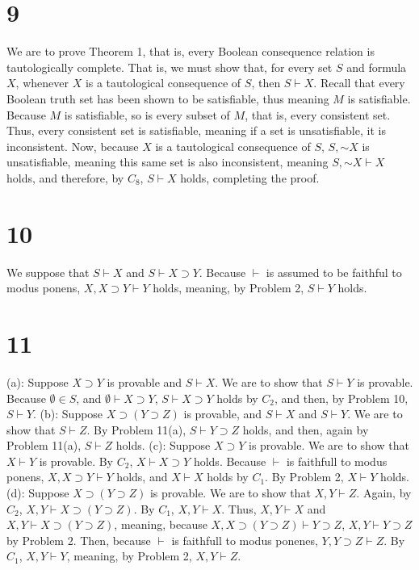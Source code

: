 \documentclass{article}
\newcommand*{\oldneg}{\mathord{\sim}}
\let\oldemptyset\emptyset
\theoremstyle{definition}
\begin{document}
\section*{9}
We are to prove Theorem 1, that is, every Boolean consequence relation is tautologically complete. That is, we must show that, for every set $S$ 
and formula $X$, whenever $X$ is a tautological consequence of $S$, then $S\vdash X$. 
Recall that every Boolean truth set has been shown to be satisfiable, thus meaning $M$ is satisfiable. Because $M$ is satisfiable, so is every 
subset of $M$, that is, every consistent set. Thus, every consistent set is satisfiable, meaning if a set is unsatisfiable, it is inconsistent. Now, 
because $X$ is a tautological consequence of $S$, $S,\oldneg X$ is unsatisfiable, meaning this same set is also inconsistent, meaning 
$S,\oldneg X\vdash X$ holds, and therefore, by $C_8$, $S\vdash X$ holds, completing the proof.  

\section*{10}
We suppose that $S\vdash X$ and $S\vdash X\supset Y$. Because $\vdash$ is assumed to be faithful to modus ponens, $X,X\supset Y\vdash Y$ holds, 
meaning, by Problem 2, $S\vdash Y$ holds. 

\section*{11}
(a): Suppose $X\supset Y$ is provable and $S\vdash X$. We are to show that $S\vdash Y$ is provable. Because $\oldemptyset\in S$, and 
$\oldemptyset\vdash X\supset Y$, $S\vdash X\supset Y$ holds by $C_2$, and then, by Problem 10, $S\vdash Y$.\newline
(b): Suppose $X\supset(Y\supset Z)$ is provable, and $S\vdash X$ and $S\vdash Y$. We are to show that $S\vdash Z$. By Problem 11(a), 
$S\vdash Y\supset Z$ holds, and then, again by Problem 11(a), $S\vdash Z$ holds.\newline
(c): Suppose $X\supset Y$ is provable. We are to show that $X\vdash Y$ is provable. By $C_2$, $X\vdash X\supset Y$ holds. Because 
$\vdash$ is faithfull to modus ponens, $X,X\supset Y\vdash Y$ holds, and $X\vdash X$ holds by $C_1$. By Problem 2, $X\vdash Y$ holds.\newline
(d): Suppose $X\supset (Y\supset Z)$ is provable. We are to show that $X,Y\vdash Z$. Again, by $C_2$, $X,Y\vdash X\supset (Y\supset Z)$. 
By $C_1$, $X,Y\vdash X$. Thus, $X,Y\vdash X$ and $X,Y\vdash X\supset (Y\supset Z)$, meaning, because $X,X\supset (Y\supset Z)\vdash Y\supset Z$, 
$X,Y\vdash Y\supset Z$ by Problem 2. Then, because $\vdash$ is faithfull to modus ponenes, $Y,Y\supset Z\vdash Z$. By $C_1$, 
$X,Y\vdash Y$, meaning, by Problem 2, $X,Y\vdash Z$.    
\end{document}
